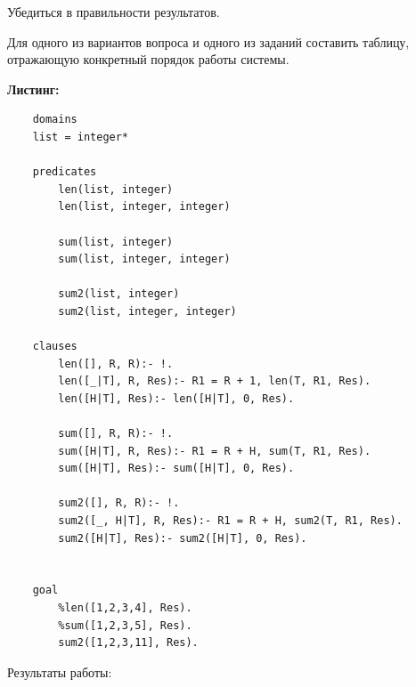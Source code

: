 \documentclass[12pt, a4paper]{extarticle}
\begin{document}
Убедиться в правильности результатов. 

Для одного из вариантов вопроса и одного из заданий составить таблицу, отражающую конкретный порядок работы системы. 


\hfill

\textbf{Листинг:}

\begin{lstlisting}
	domains
	list = integer*
	
	predicates
		len(list, integer)
		len(list, integer, integer)
		
		sum(list, integer)
		sum(list, integer, integer)
		
		sum2(list, integer)
		sum2(list, integer, integer)
	
	clauses
		len([], R, R):- !.
		len([_|T], R, Res):- R1 = R + 1, len(T, R1, Res).
		len([H|T], Res):- len([H|T], 0, Res).
		
		sum([], R, R):- !.
		sum([H|T], R, Res):- R1 = R + H, sum(T, R1, Res).
		sum([H|T], Res):- sum([H|T], 0, Res).
		
		sum2([], R, R):- !.
		sum2([_, H|T], R, Res):- R1 = R + H, sum2(T, R1, Res).
		sum2([H|T], Res):- sum2([H|T], 0, Res).
		
	
	goal
		%len([1,2,3,4], Res).
		%sum([1,2,3,5], Res).
		sum2([1,2,3,11], Res).
\end{lstlisting}
\par
Результаты работы:\par
\begin{figure}[h!]
	\begin{minipage}[h]{0.31\linewidth}
	\end{minipage}
	\hfill
	\begin{minipage}[h]{0.31\linewidth}
	\end{minipage}
	\hfill
	\begin{minipage}[h]{0.31\linewidth}
	\end{minipage}
\end{figure}\par
\end{document}
